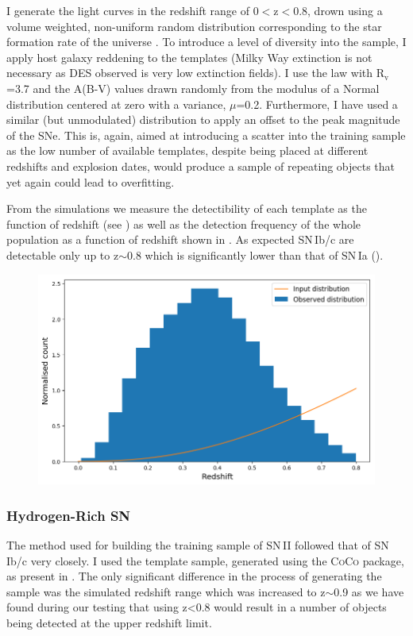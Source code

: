 I generate the light curves in the redshift range of 0$<$z$<$0.8, drown using a volume weighted, non-uniform random distribution corresponding to the star formation rate of the universe \citep{Hopkins2006}. To introduce a level of diversity into the sample, I apply host galaxy reddening to the templates (Milky Way extinction is not necessary as DES observed is very low extinction fields). I use the \citet{Cardelli1989} law with R$_\mathrm{v}$=3.7 and the A(B-V) values drawn randomly from the modulus of a Normal distribution centered at zero with a variance, $\mu$=0.2. Furthermore, I have used a similar (but unmodulated) distribution to apply an offset to the peak magnitude of the SNe. This is, again, aimed at introducing a scatter into the training sample as the low number of available templates, despite being placed at different redshifts and explosion dates, would produce a sample of repeating objects that yet again could lead to overfitting.

From the simulations we measure the detectibility of each template as the function of redshift (see ) as well as the detection frequency of the whole population as a function of redshift shown in . As expected SN\,Ib/c are detectable only up to z$\sim$0.8 which is significantly lower than that of SN\,Ia ().

\begin{figure}
  \includegraphics[width=\textwidth]{Figures/Chapter5/SNIbc_z_dist.png}
  \caption{}
  \label{fig:IbcDist}
\end{figure}

\subsubsection{Hydrogen-Rich SN}
The method used for building the training sample of SN\,II followed that of SN\,Ib/c very closely. I used the template sample, generated using the \textsc{CoCo} package, as present in . The only significant difference in the process of generating the sample was the simulated redshift range which was increased to z$\sim$0.9 as we have found during our testing that using z<0.8 would result in a number of objects being detected at the upper redshift limit.


